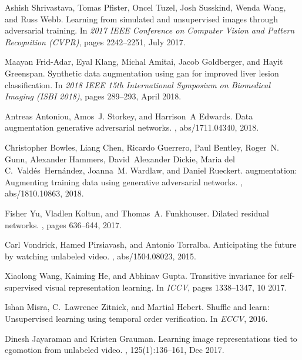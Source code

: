 \documentclass{article}
\begin{document}
{\begin{thebibliography}{10}
Ashish Shrivastava, Tomas Pfister, Oncel Tuzel, Josh Susskind, Wenda Wang, and
  Russ Webb.
\newblock Learning from simulated and unsupervised images through adversarial
  training.
\newblock In {\em 2017 IEEE Conference on Computer Vision and Pattern
  Recognition (CVPR)}, pages 2242--2251, July 2017.

Maayan Frid-Adar, Eyal Klang, Michal Amitai, Jacob Goldberger, and Hayit
  Greenspan.
\newblock Synthetic data augmentation using gan for improved liver lesion
  classification.
\newblock In {\em 2018 IEEE 15th International Symposium on Biomedical Imaging
  (ISBI 2018)}, pages 289--293, April 2018.

Antreas Antoniou, Amos~J. Storkey, and Harrison~A Edwards.
\newblock Data augmentation generative adversarial networks.
, abs/1711.04340, 2018.

Christopher Bowles, Liang Chen, Ricardo Guerrero, Paul Bentley, Roger~N. Gunn,
  Alexander Hammers, David~Alexander Dickie, Maria del
  C.~Vald{\'{e}}s~Hern{\'{a}}ndez, Joanna~M. Wardlaw, and Daniel Rueckert.
 augmentation: Augmenting training data using generative
  adversarial networks.
, abs/1810.10863, 2018.

Fisher Yu, Vladlen Koltun, and Thomas~A. Funkhouser.
\newblock Dilated residual networks.
, pages 636--644, 2017.

Carl Vondrick, Hamed Pirsiavash, and Antonio Torralba.
\newblock Anticipating the future by watching unlabeled video.
, abs/1504.08023, 2015.

Xiaolong Wang, Kaiming He, and Abhinav Gupta.
\newblock Transitive invariance for self-supervised visual representation
  learning.
\newblock In {\em ICCV}, pages 1338--1347, 10 2017.

Ishan Misra, C.~Lawrence Zitnick, and Martial Hebert.
\newblock Shuffle and learn: Unsupervised learning using temporal order
  verification.
\newblock In {\em ECCV}, 2016.

Dinesh Jayaraman and Kristen Grauman.
\newblock Learning image representations tied to egomotion from unlabeled
  video.
, 125(1):136--161, Dec
  2017.


\end{thebibliography}}
\end{document}

